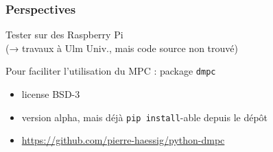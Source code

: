 \begin{frame}[c]
  \frametitle{Perspectives}
  
  Tester sur des Raspberry Pi\\ (→ travaux à Ulm Univ., mais code source non trouvé)
  

  \bigskip \pause
  
  Pour faciliter l'utilisation du MPC :
  package \texttt{dmpc} 
  
  \begin{itemize}
   \item license BSD-3 
   \item version alpha, mais déjà \texttt{pip install}-able depuis le dépôt
   \item \url{https://github.com/pierre-haessig/python-dmpc}
  \end{itemize}
  
  \bigskip \pause
  
  
\end{frame}



